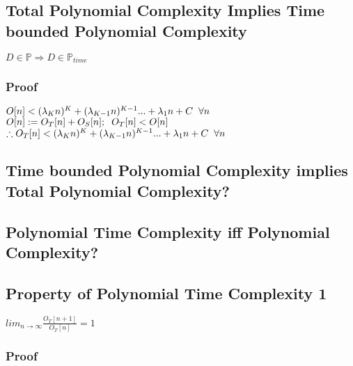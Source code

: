 \documentclass[11pt]{article}
\begin{document}
\subsection{Total Polynomial Complexity Implies Time bounded Polynomial Complexity}
\begin{center}
\vspace{1mm}
$
D \in \mathbb{P} \Longrightarrow D \in \mathbb{P}_{time}
$
\end{center}

\subsubsection{Proof}
\begin{center}
$
O[n] < (\lambda_K n)^K + (\lambda_{K-1} n)^{K-1}... + \lambda_1 n + C \hspace{2mm} \forall n
$
\\ \vspace{2mm}
$
O[n] := O_T[n] + O_S[n]; \hspace{2mm} O_T[n] < O[n]
$
\\ \vspace{2mm}
$
\therefore O_T[n] < (\lambda_K n)^K + (\lambda_{K-1} n)^{K-1}... + \lambda_1 n + C \hspace{2mm} \forall n
$
\end{center}






\subsection{Time bounded Polynomial Complexity implies Total Polynomial Complexity?}
\subsection{Polynomial Time Complexity iff Polynomial Complexity?}




\subsection{Property of Polynomial Time Complexity 1}
\begin{center}
$
lim_{n \rightarrow \infty} \frac{O_T[n+1]}{O_T[n]} = 1
$
\end{center}
\subsubsection{Proof}
\end{document}
